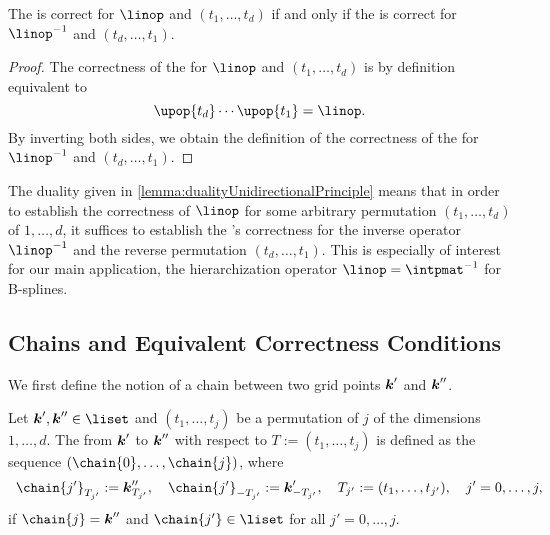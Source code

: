 \begin{lemma}
  \label{lemma:dualityUnidirectionalPrinciple}
  The \up is correct for $\linop$ and $(t_1, \dotsc, t_d)$
  if and only if the \up is correct for $\linopinv$ and $(t_d, \dotsc, t_1)$.
\end{lemma}

\begin{proof}
  The correctness of the \up for $\linop$ and $(t_1, \dotsc, t_d)$
  is by definition equivalent to
  \begin{equation}
    \upop{t_d} \dotsm \upop{t_1} = \linop.
  \end{equation}
  By inverting both sides, we obtain the definition of the
  correctness of the \up for $\linopinv$ and $(t_d, \dotsc, t_1)$.
\end{proof}

The duality given in \cref{lemma:dualityUnidirectionalPrinciple}
means that in order to establish the correctness of $\linop$
for some arbitrary permutation $(t_1, \dotsc, t_d)$ of $1, \dotsc, d$,
it suffices to establish the \up's correctness for the
inverse operator $\linopinv$ and the reverse permutation $(t_d, \dotsc, t_1)$.
This is especially of interest for our main application,
the hierarchization operator $\linop = \intpmatinv$ for B-splines.



\subsection{Chains and Equivalent Correctness Conditions}
\label{sec:453chains}

We first define the notion of a chain between two grid points
${\boldsymbol{k}}'$ and ${\boldsymbol{k}}''$.

\begin{definition}[chain]
  \label{def:chain}
  Let $\*k', \*k'' \in \liset$ and
  $(t_1, \dotsc, t_j)$ be a permutation of $j$ of the
  dimensions $1, \dotsc, d$.
  The  from ${\boldsymbol{k}}'$ to ${\boldsymbol{k}}''$ with respect to
  $T := (t_1, \dotsc, t_j)$ is defined as the sequence
  $(\chain{0}, \dotsc, \chain{j})$, where
  \begin{equation}
    \chain{j'}_{T_{j'}}
    := \*k''_{T_{j'}},\quad
    \chain{j'}_{-T_{j'}}
    := \*k'_{-T_{j'}},\quad
    T_{j'}
    := (t_1, \dotsc, t_{j'}),\quad
    j' = 0, \dotsc, j,
    \hspace*{-10mm}
  \end{equation}
  if $\chain{j} = \*k''$ and
  $\chain{j'} \in \liset$ for all $j' = 0, \dotsc, j$.
\end{definition}

